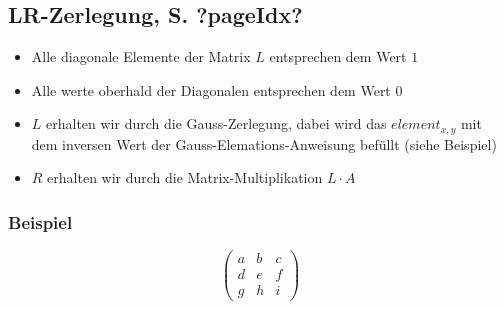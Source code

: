 \subsection{LR-Zerlegung, S. ?pageIdx?}

\begin{itemize}
\item Alle diagonale Elemente der Matrix $L$ entsprechen dem Wert $1$
\item Alle werte oberhald der Diagonalen entsprechen dem Wert $0$ 
\item $L$ erhalten wir durch die Gauss-Zerlegung, dabei wird das $element_{x,y}$ mit dem inversen Wert der Gauss-Elemations-Anweisung befüllt (siehe Beispiel)
\item $R$ erhalten wir durch die Matrix-Multiplikation $L\cdot A$
\end{itemize}

\subsubsection{Beispiel}
\[ \left( \begin{array}{ccc}
a & b & c \\
d & e & f \\
g & h & i \end{array} \right)\]
